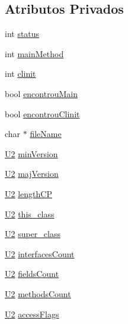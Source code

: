 \subsection*{Atributos Privados}
\begin{DoxyCompactItemize}
\item 
int \hyperlink{classClassFile_a9afeae9ac0889ab75909e73933e29326}{status}
\item 
int \hyperlink{classClassFile_ac1cdef340faa0bd945b2236057433978}{main\+Method}
\item 
int \hyperlink{classClassFile_aa1eb77ebbd737bde7edde5fbdb2b6992}{clinit}
\item 
bool \hyperlink{classClassFile_ad8d08e096c470901c62d1a9e31a202bf}{encontrou\+Main}
\item 
bool \hyperlink{classClassFile_a5c60c8d51584f48f22bdbdd719960e05}{encontrou\+Clinit}
\item 
char $\ast$ \hyperlink{classClassFile_a2789cf19be5abaeadf96f83de33174a4}{file\+Name}
\item 
\hyperlink{BasicTypes_8h_a90240657108b1b457eef9d3f76e0202e}{U2} \hyperlink{classClassFile_ab0d3a4474a9907dc61893d0293525b38}{min\+Version}
\item 
\hyperlink{BasicTypes_8h_a90240657108b1b457eef9d3f76e0202e}{U2} \hyperlink{classClassFile_a40bd108a13debb86701cf31742572686}{maj\+Version}
\item 
\hyperlink{BasicTypes_8h_a90240657108b1b457eef9d3f76e0202e}{U2} \hyperlink{classClassFile_acde5006251ffd25149efa4d6fb725cf5}{length\+CP}
\item 
\hyperlink{BasicTypes_8h_a90240657108b1b457eef9d3f76e0202e}{U2} \hyperlink{classClassFile_a205bc5af050f4676fc4c3ff7992c4959}{this\+\_\+class}
\item 
\hyperlink{BasicTypes_8h_a90240657108b1b457eef9d3f76e0202e}{U2} \hyperlink{classClassFile_ad92079216f8cdb366a3002e5ca2c2dfa}{super\+\_\+class}
\item 
\hyperlink{BasicTypes_8h_a90240657108b1b457eef9d3f76e0202e}{U2} \hyperlink{classClassFile_a1bbca13f93ec21beffa8a56e360c9f8d}{interfaces\+Count}
\item 
\hyperlink{BasicTypes_8h_a90240657108b1b457eef9d3f76e0202e}{U2} \hyperlink{classClassFile_a5eae2e906695e596b89614df0e4b060a}{fields\+Count}
\item 
\hyperlink{BasicTypes_8h_a90240657108b1b457eef9d3f76e0202e}{U2} \hyperlink{classClassFile_a4c362d4adfeaad02f4517caf1ba58103}{methods\+Count}
\item 
\hyperlink{BasicTypes_8h_a90240657108b1b457eef9d3f76e0202e}{U2} \hyperlink{classClassFile_a16d2ca3e9cdf9267adde08575c57bfa9}{access\+Flags}

\end{DoxyCompactItemize}
